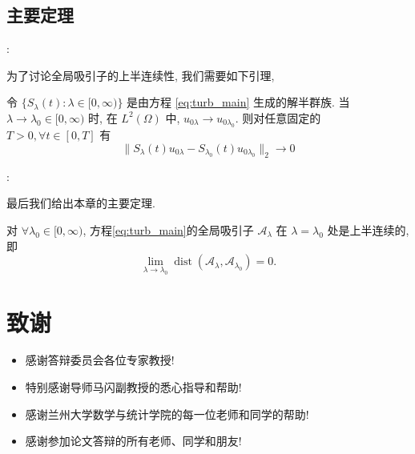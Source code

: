 \documentclass[UTF8]{ctexbeamer}
\newcommand*\norm[1]{\lVert#1\rVert}
\newcommand*\Brace[1]{\lbrace#1\rbrace}
\DeclareMathOperator{\dist}{dist}
\begin{document}
\subsection{主要定理}
\begin{frame}{\secname : \subsecname}

    为了讨论全局吸引子的上半连续性, 我们需要如下引理,
    \begin{lemma}\label{lem:slambdacontinuous}
        令 $\Brace{S_\lambda(t) \colon \lambda \in [0, \infty)}$ 是由方程 \eqref{eq:turb_main} 生成的解半群族.
        当 $\lambda \to \lambda_0 \in [0, \infty)$ 时, 在 $L^2(\Omega)$ 中, $u_{0\lambda} \to u_{0\lambda_0}$.
        则对任意固定的 $T > 0, \forall t \in [0, T]$ 有
        \begin{equation*}
            \norm{S_\lambda(t)u_{0\lambda} - S_{\lambda_0}(t)u_{0\lambda_0}}_2 \to 0
        \end{equation*}
    \end{lemma}

\end{frame}
\begin{frame}{\secname : \subsecname}

    最后我们给出本章的主要定理.
    \begin{theorem}
        对 $\forall \lambda_0 \in [0, \infty)$, 
        方程\cref{eq:turb_main}的全局吸引子 $\mathcal{A}_\lambda$ 在 $\lambda = \lambda_0$ 处是上半连续的, 即
        \begin{equation*}
            \lim_{\lambda \to \lambda_0} \dist(\mathcal{A}_\lambda, \mathcal{A}_{\lambda_0}) = 0.
        \end{equation*}
    \end{theorem}

\end{frame}

\section{致谢}
\begin{frame}{\secname}

    \begin{itemize}
        \item 感谢答辩委员会各位专家教授!
        \item 特别感谢导师马闪副教授的悉心指导和帮助!
        \item 感谢兰州大学数学与统计学院的每一位老师和同学的帮助!
        \item 感谢参加论文答辩的所有老师、同学和朋友!
    \end{itemize}

\end{frame}
\end{document}
